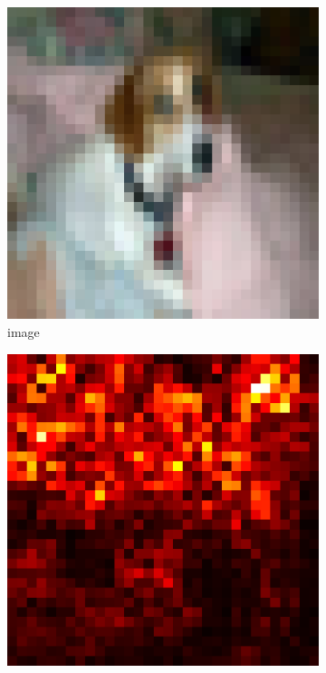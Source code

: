 \documentclass[preprint,12pt]{elsarticle}
\begin{document}
\begin{figure}
    \centering
    \begin{subfigure}{0.14\linewidth}
        \centering
        \includegraphics[width=\linewidth]{../visualizations/examples/cifar10/cnn/images/5.png}
        \caption{image}
    \end{subfigure}
    \hfill
    \begin{subfigure}{0.14\linewidth}
        \centering
        \includegraphics[width=\linewidth]{../visualizations/examples/cifar10/cnn/saliency_map/5.png}

\end{subfigure}
\end{figure}
\end{document}
